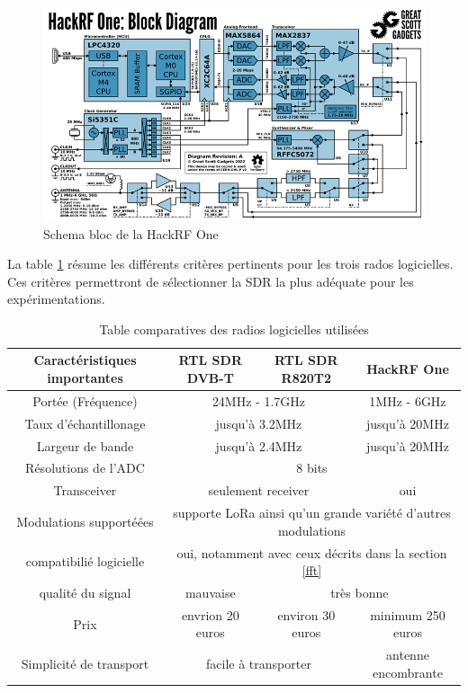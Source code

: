 \begin{figure}[h]
\centering

\includegraphics[scale=0.8]{images/SBhackrf.png}
\caption{Schema bloc de la HackRF One}\label{term3001}
\end{figure}


La table  \ref{table1} résume les différents critères pertinents pour les trois rados logicielles. Ces critères permettront de sélectionner la SDR la plus adéquate pour les expérimentations.


\begin{table}[h]
\centering
\begin{adjustbox}{width=1.2\textwidth}
\begin{tabular}{|c|c|c|c|}
\hline
\multicolumn{1}{|c|}{Caractéristiques importantes} & \multicolumn{1}{c|}{RTL SDR DVB-T} & \multicolumn{1}{c|}{RTL SDR R820T2} & \multicolumn{1}{c|}{HackRF One}\\
\hline
Portée (Fréquence) & \multicolumn{2}{c|}{24MHz - 1.7GHz} & 1MHz - 6GHz \\
\hline
Taux d'échantillonage & \multicolumn{2}{c|}{jusqu'à 3.2MHz} & jusqu'à 20MHz \\
\hline
Largeur de bande & \multicolumn{2}{c|}{jusqu'à 2.4MHz} & jusqu'à 20MHz  \\
\hline
Résolutions de l'ADC & \multicolumn{3}{c|}{8 bits} \\
\hline
Transceiver & \multicolumn{2}{c|}{seulement receiver} & oui \\
\hline
Modulations supportéées & \multicolumn{3}{c|}{supporte LoRa ainsi qu'un grande variété d'autres modulations} \\
\hline
compatibilié logicielle & \multicolumn{3}{c|}{oui, notamment avec ceux décrits dans la section \ref{fft}} \\
\hline
qualité du signal & mauvaise &\multicolumn{2}{c|}{très bonne}\\
\hline
Prix & envrion 20 euros & environ 30 euros & minimum 250 euros \\
\hline
Simplicité de transport & \multicolumn{2}{c|}{facile à transporter} & antenne encombrante \\
\hline
\end{tabular}
\end{adjustbox}
\caption{Table comparatives des radios logicielles utilisées}
\label{table1}
\end{table}



